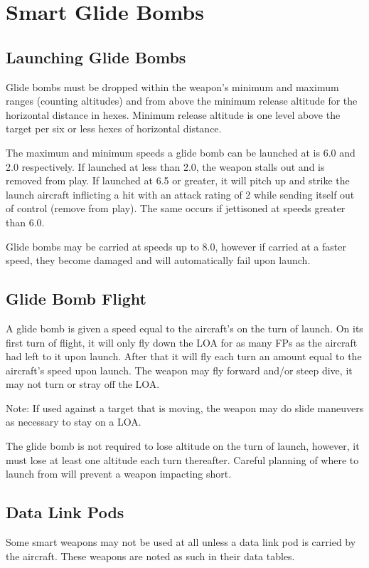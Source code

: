 \section{Smart Glide Bombs}

\subsection{Launching Glide Bombs} Glide bombs must be dropped within the weapon's minimum and maximum ranges (counting altitudes) and from above the minimum release altitude for the horizontal distance in hexes. Minimum release altitude is one level above the target per six or less hexes of horizontal distance.

The maximum and minimum speeds a glide bomb can be launched at is 6.0 and 2.0 respectively. If launched at less than 2.0, the weapon stalls out and is removed from play. If launched at 6.5 or greater, it will pitch up and strike the launch aircraft inflicting a hit with an attack rating of 2 while sending itself out of control (remove from play). The same occurs if jettisoned at speeds greater than 6.0.

Glide bombs may be carried at speeds up to 8.0, however if carried at a faster speed, they become damaged and will automatically fail upon launch.

\subsection{Glide Bomb Flight} A glide bomb is given a speed equal to the aircraft's on the turn of launch. On its first turn of flight, it will only fly down the LOA for as many FPs as the aircraft had left to it upon launch. After that it will fly each turn an amount equal to the aircraft's speed upon launch. The weapon may fly forward and/or steep dive, it may not turn or stray off the LOA.

Note: If used against a target that is moving, the weapon may do slide maneuvers as necessary to stay on a LOA.

The glide bomb is not required to lose altitude on the turn of launch, however, it must lose at least one altitude each turn thereafter. Careful planning of where to launch from will prevent a weapon impacting short.

\subsection{Data Link Pods}
\label{rule:data-link-pods}
Some smart weapons may not be used at all unless a data link pod is carried by the aircraft. These weapons are noted as such in their data tables.

